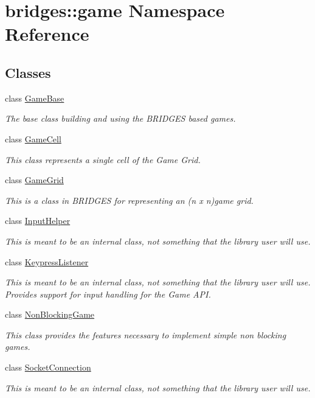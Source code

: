 \hypertarget{namespacebridges_1_1game}{}\section{bridges\+:\+:game Namespace Reference}
\label{namespacebridges_1_1game}
\subsection*{Classes}
\begin{DoxyCompactItemize}
\item 
class \hyperlink{classbridges_1_1game_1_1_game_base}{Game\+Base}
\begin{DoxyCompactList}\small\item\em The base class building and using the B\+R\+I\+D\+G\+ES based games. \end{DoxyCompactList}\item 
class \hyperlink{classbridges_1_1game_1_1_game_cell}{Game\+Cell}
\begin{DoxyCompactList}\small\item\em This class represents a single cell of the Game Grid. \end{DoxyCompactList}\item 
class \hyperlink{classbridges_1_1game_1_1_game_grid}{Game\+Grid}
\begin{DoxyCompactList}\small\item\em This is a class in B\+R\+I\+D\+G\+ES for representing an (n x n)game grid. \end{DoxyCompactList}\item 
class \hyperlink{classbridges_1_1game_1_1_input_helper}{Input\+Helper}
\begin{DoxyCompactList}\small\item\em This is meant to be an internal class, not something that the library user will use. \end{DoxyCompactList}\item 
class \hyperlink{classbridges_1_1game_1_1_keypress_listener}{Keypress\+Listener}
\begin{DoxyCompactList}\small\item\em This is meant to be an internal class, not something that the library user will use. Provides support for input handling for the Game A\+PI. \end{DoxyCompactList}\item 
class \hyperlink{classbridges_1_1game_1_1_non_blocking_game}{Non\+Blocking\+Game}
\begin{DoxyCompactList}\small\item\em This class provides the features necessary to implement simple non blocking games. \end{DoxyCompactList}\item 
class \hyperlink{classbridges_1_1game_1_1_socket_connection}{Socket\+Connection}
\begin{DoxyCompactList}\small\item\em This is meant to be an internal class, not something that the library user will use. \end{DoxyCompactList}\end{DoxyCompactItemize}
